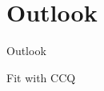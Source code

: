 \section{Outlook}
\renewcommand{\currentEdge}{all}

\begin{frame}{Outlook}
\end{frame}

\begin{frame}{Fit with CCQ}
\end{frame}
